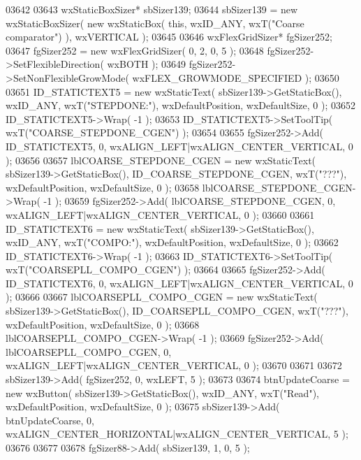 \begin{DoxyCode}
03642     
03643     wxStaticBoxSizer* sbSizer139;
03644     sbSizer139 = \textcolor{keyword}{new} wxStaticBoxSizer( \textcolor{keyword}{new} wxStaticBox( \textcolor{keyword}{this}, wxID\_ANY, wxT(\textcolor{stringliteral}{"Coarse comparator"}) ), 
      wxVERTICAL );
03645     
03646     wxFlexGridSizer* fgSizer252;
03647     fgSizer252 = \textcolor{keyword}{new} wxFlexGridSizer( 0, 2, 0, 5 );
03648     fgSizer252->SetFlexibleDirection( wxBOTH );
03649     fgSizer252->SetNonFlexibleGrowMode( wxFLEX\_GROWMODE\_SPECIFIED );
03650     
03651     ID_STATICTEXT5 = \textcolor{keyword}{new} wxStaticText( sbSizer139->GetStaticBox(), wxID\_ANY, wxT(\textcolor{stringliteral}{"STEPDONE:"}), 
      wxDefaultPosition, wxDefaultSize, 0 );
03652     ID_STATICTEXT5->Wrap( -1 );
03653     ID_STATICTEXT5->SetToolTip( wxT(\textcolor{stringliteral}{"COARSE\_STEPDONE\_CGEN"}) );
03654     
03655     fgSizer252->Add( ID_STATICTEXT5, 0, wxALIGN\_LEFT|wxALIGN\_CENTER\_VERTICAL, 0 );
03656     
03657     lblCOARSE_STEPDONE_CGEN = \textcolor{keyword}{new} wxStaticText( sbSizer139->GetStaticBox(), 
      ID_COARSE_STEPDONE_CGEN, wxT(\textcolor{stringliteral}{"???"}), wxDefaultPosition, wxDefaultSize, 0 );
03658     lblCOARSE_STEPDONE_CGEN->Wrap( -1 );
03659     fgSizer252->Add( lblCOARSE_STEPDONE_CGEN, 0, wxALIGN\_LEFT|wxALIGN\_CENTER\_VERTICAL, 0 );
03660     
03661     ID_STATICTEXT6 = \textcolor{keyword}{new} wxStaticText( sbSizer139->GetStaticBox(), wxID\_ANY, wxT(\textcolor{stringliteral}{"COMPO:"}), 
      wxDefaultPosition, wxDefaultSize, 0 );
03662     ID_STATICTEXT6->Wrap( -1 );
03663     ID_STATICTEXT6->SetToolTip( wxT(\textcolor{stringliteral}{"COARSEPLL\_COMPO\_CGEN"}) );
03664     
03665     fgSizer252->Add( ID_STATICTEXT6, 0, wxALIGN\_LEFT|wxALIGN\_CENTER\_VERTICAL, 0 );
03666     
03667     lblCOARSEPLL_COMPO_CGEN = \textcolor{keyword}{new} wxStaticText( sbSizer139->GetStaticBox(), 
      ID_COARSEPLL_COMPO_CGEN, wxT(\textcolor{stringliteral}{"???"}), wxDefaultPosition, wxDefaultSize, 0 );
03668     lblCOARSEPLL_COMPO_CGEN->Wrap( -1 );
03669     fgSizer252->Add( lblCOARSEPLL_COMPO_CGEN, 0, wxALIGN\_LEFT|wxALIGN\_CENTER\_VERTICAL, 0 );
03670     
03671     
03672     sbSizer139->Add( fgSizer252, 0, wxLEFT, 5 );
03673     
03674     btnUpdateCoarse = \textcolor{keyword}{new} wxButton( sbSizer139->GetStaticBox(), wxID\_ANY, wxT(\textcolor{stringliteral}{"Read"}), wxDefaultPosition, 
      wxDefaultSize, 0 );
03675     sbSizer139->Add( btnUpdateCoarse, 0, wxALIGN\_CENTER\_HORIZONTAL|wxALIGN\_CENTER\_VERTICAL, 5 );
03676     
03677     
03678     fgSizer88->Add( sbSizer139, 1, 0, 5 );

\end{DoxyCode}
